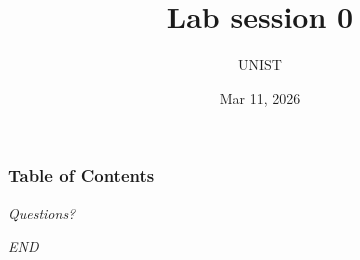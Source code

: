 \documentclass[aspectratio=169,10pt]{beamer}
\title[Introduction to AIP2] %
{Lab session 0}
\author{UNIST}
\institute[UNIST] %
{
  Ulsan National Institute of Science and Technology
}
\date %
{Mar 11, 2026}
\begin{document}
\frame{\titlepage}


\begin{frame}
\frametitle{Table of Contents}
\tableofcontents
\end{frame}



\begin{frame}{}
  \centering \Large
  \emph{Questions?}
\end{frame}


\begin{frame}{}
    \centering \Large
    \emph{END}
\end{frame}
  
\end{document}
